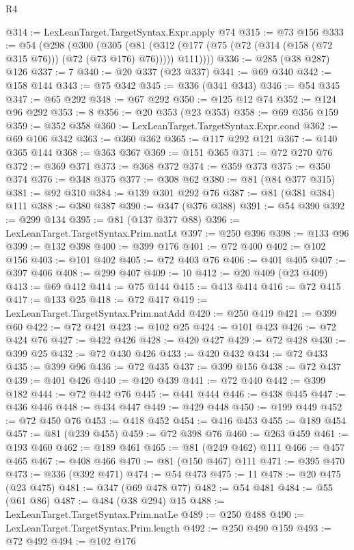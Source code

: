 \begin{lexlean}{R4}
\begin{coremodule}
@314 := LexLeanTarget.TargetSyntax.Expr.apply @74
@315 := @73 @156
@333 := @54
    (@298
      (@300
        (@305
          (@81 (@312 (@177 (@75 (@72 (@314 (@158 (@72 @315 @76))) (@72 (@73 @176) @76))))) @111))))
@336 := @285 (@38 @287) @126
@337 := 7
@340 := @20 @337 (@23 @337)
@341 := @69 @340
@342 := @158 @144
@343 := @75 @342
@345 := @336 (@341 @343)
@346 := @54 @345
@347 := @65 @292
@348 := @67 @292
@350 := @125 @12 @74
@352 := @124 @96 @292
@353 := 8
@356 := @20 @353 (@23 @353)
@358 := @69 @356 @159
@359 := @352 @358
@360 := LexLeanTarget.TargetSyntax.Expr.cond
@362 := @69 @106 @342
@363 := @360 @362
@365 := @117 @292 @121
@367 := @140 @365 @144
@368 := @363 @367
@369 := @151 @365
@371 := @72 @270 @76
@372 := @369 @371
@373 := @368 @372
@374 := @359 @373
@375 := @350 @374
@376 := @348 @375
@377 := @308 @62
@380 := @81 (@84 @377 @315)
@381 := @92 @310
@384 := @139 @301 @292 @76
@387 := @81 (@381 @384) @111
@388 := @380 @387
@390 := @347 (@376 @388)
@391 := @54 @390
@392 := @299 @134
@395 := @81 (@137 @377 @88)
@396 := LexLeanTarget.TargetSyntax.Prim.natLt
@397 := @250 @396
@398 := @133 @96
@399 := @132 @398
@400 := @399 @176
@401 := @72 @400
@402 := @102 @156
@403 := @101 @402
@405 := @72 @403 @76
@406 := @401 @405
@407 := @397 @406
@408 := @299 @407
@409 := 10
@412 := @20 @409 (@23 @409)
@413 := @69 @412
@414 := @75 @144
@415 := @413 @414
@416 := @72 @415
@417 := @133 @25
@418 := @72 @417
@419 := LexLeanTarget.TargetSyntax.Prim.natAdd
@420 := @250 @419
@421 := @399 @60
@422 := @72 @421
@423 := @102 @25
@424 := @101 @423
@426 := @72 @424 @76
@427 := @422 @426
@428 := @420 @427
@429 := @72 @428
@430 := @399 @25
@432 := @72 @430 @426
@433 := @420 @432
@434 := @72 @433
@435 := @399 @96
@436 := @72 @435
@437 := @399 @156
@438 := @72 @437
@439 := @401 @426
@440 := @420 @439
@441 := @72 @440
@442 := @399 @182
@444 := @72 @442 @76
@445 := @441 @444
@446 := @438 @445
@447 := @436 @446
@448 := @434 @447
@449 := @429 @448
@450 := @199 @449
@452 := @72 @450 @76
@453 := @418 @452
@454 := @416 @453
@455 := @189 @454
@457 := @81 (@239 @455)
@459 := @72 @398 @76
@460 := @263 @459
@461 := @193 @460
@462 := @189 @461
@465 := @81 (@249 @462) @111
@466 := @457 @465
@467 := @408 @466
@470 := @81 (@150 @467) @111
@471 := @395 @470
@473 := @336 (@392 @471)
@474 := @54 @473
@475 := 11
@478 := @20 @475 (@23 @475)
@481 := @347 (@69 @478 @77)
@482 := @54 @481
@484 := @55 (@61 @86)
@487 := @484 (@38 @294) @15
@488 := LexLeanTarget.TargetSyntax.Prim.natLe
@489 := @250 @488
@490 := LexLeanTarget.TargetSyntax.Prim.length
@492 := @250 @490 @159
@493 := @72 @492
@494 := @102 @176

\end{coremodule}
\end{lexlean}
